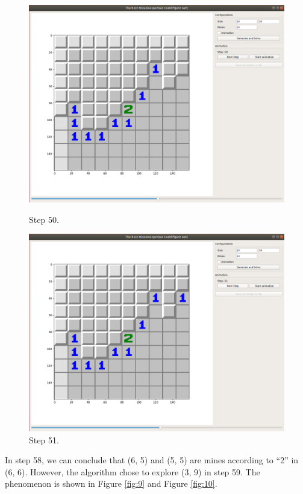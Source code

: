 \documentclass[letter]{article}
\begin{document}
\begin{enumerate}
	\begin{figure}[H]
		\includegraphics[width=\textwidth]{../pics/7.png}
		\caption{\label{fig:7}Step 50.}
		\endminipage\hfill
		\includegraphics[width=\textwidth]{../pics/8.png}
		\caption{\label{fig:8}Step 51.}
		\endminipage
	\end{figure}
	
	In step 58, we can conclude that (6, 5) and (5, 5) are mines according to ``2'' in (6, 6). However, the algorithm chose to explore (3, 9) in step 59. The phenomenon is shown in Figure \ref{fig:9} and Figure \ref{fig:10}.
	

\end{enumerate}
\end{document}
